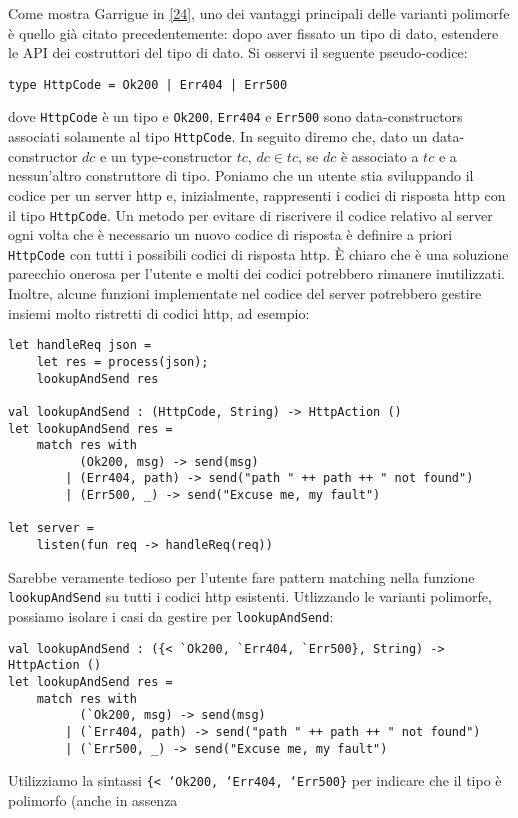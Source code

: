 \documentclass[10pt,a4paper]{article}
\begin{document}
Come mostra Garrigue in \hyperlink{bibl24}{[24]}, uno dei vantaggi principali delle varianti polimorfe è quello già
citato precedentemente: dopo aver fissato un tipo di dato, estendere le API dei costruttori del tipo di dato. Si osservi il
seguente pseudo-codice:
\begin{lstlisting}
type HttpCode = Ok200 | Err404 | Err500
\end{lstlisting}
dove \texttt{HttpCode} è un tipo e \texttt{Ok200}, \texttt{Err404} e \texttt{Err500} sono data-constructors associati
solamente al tipo \texttt{HttpCode}. In seguito diremo che, dato un data-constructor $ dc $ e un type-constructor $ tc $,
$ dc \in tc $, se $ dc $ è associato a $ tc $ e a nessun'altro construttore di tipo. Poniamo che un utente stia
sviluppando il codice per un server http e, inizialmente, rappresenti i codici di risposta http con il tipo
\texttt{HttpCode}. Un metodo per evitare di riscrivere il codice relativo al server ogni volta che è necessario un nuovo
codice di risposta è definire a priori \texttt{HttpCode} con tutti i possibili codici di risposta http. \`E chiaro che è una
soluzione parecchio onerosa per l'utente e molti dei codici potrebbero rimanere inutilizzati. Inoltre,
alcune funzioni implementate nel codice del server potrebbero gestire insiemi molto ristretti di codici http, ad esempio:
\begin{lstlisting}
let handleReq json =
    let res = process(json);
    lookupAndSend res

val lookupAndSend : (HttpCode, String) -> HttpAction ()
let lookupAndSend res =
    match res with
          (Ok200, msg) -> send(msg)
        | (Err404, path) -> send("path " ++ path ++ " not found")
        | (Err500, _) -> send("Excuse me, my fault")

let server =
    listen(fun req -> handleReq(req))
\end{lstlisting}
Sarebbe veramente tedioso per l'utente fare pattern matching nella funzione \texttt{lookupAndSend} su tutti i codici
http esistenti. Utlizzando le varianti polimorfe, possiamo isolare i casi da gestire per \texttt{lookupAndSend}:
\begin{lstlisting}
val lookupAndSend : ({< `Ok200, `Err404, `Err500}, String) -> HttpAction ()
let lookupAndSend res =
    match res with
          (`Ok200, msg) -> send(msg)
        | (`Err404, path) -> send("path " ++ path ++ " not found")
        | (`Err500, _) -> send("Excuse me, my fault")
\end{lstlisting}
Utilizziamo la sintassi \texttt{\{< `Ok200, `Err404, `Err500\}} per indicare che il tipo è polimorfo (anche in assenza
\end{document}
